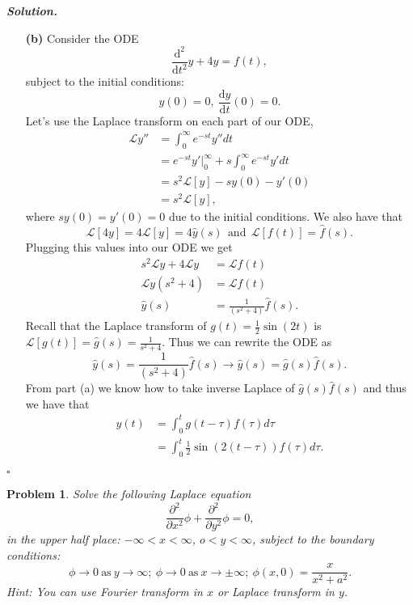 \documentclass[12pt]{report}
\newtheorem{problem}{Problem}
\newenvironment{solution}[1][\it{Solution}]{\textbf{#1. } }{$\square$}
\def\L{{\mathcal{L}}}
\newcommand{\ppn}[3]{\frac{\partial^{#1} #2}{\partial #3^{#1}}} %
\newcommand{\dd}[2]{\frac{\mathrm{d} #1}{\mathrm{d} #2}} %
\newcommand{\ddn}[3]{\frac{\mathrm{d}^{#1} #2}{\mathrm{d} #3^{#1}}} %
\begin{document}
\begin{solution}
\begin{enumerate}
        \item [{\bf (b)}]
        Consider the ODE
        \[ \ddn{2}{}{t}y + 4y = f(t),\]
        subject to the initial conditions:
        \[y(0) = 0, ~ \dd{y}{t}(0)=0. \]
        Let's use the Laplace transform on each part of our ODE,
        \begin{align*}
            \L{y''} &= \int_0^\infty e^{-st}y'' dt\\
            &= e^{-st}y' \bigg|_0^\infty + s \int_0^\infty e^{-st}y'dt\\
            &= s^2\L[y] - sy(0) - y'(0)\\
            &= s^2\L[y],
        \end{align*}
        where $sy(0) = y'(0) = 0$ due to the initial conditions. We also have that
        \[ \L[4y] = 4\L[y] = 4\hat{y}(s) ~~ \text{and} ~~ \L[f(t)] = \hat{f}(s).\]
        Plugging this values into our ODE we get
        \begin{align*}
            s^2\L{y} + 4\L{y} &= \L{f(t)}\\
            \L{y}(s^2 + 4) &= \L{f(t)}\\
            \hat{y}(s) &= \frac{1}{(s^2 + 4)}\hat{f}(s).
        \end{align*}
        Recall that the Laplace transform of $g(t) = \frac{1}{2} \sin(2t)$ is $\L[g(t)] = \hat{g}(s) = \frac{1}{s^2 + 4}$. Thus we can rewrite the ODE as
        \[ \hat{y}(s) = \frac{1}{(s^2 + 4)}\hat{f}(s) \rightarrow \hat{y}(s) = \hat{g}(s)\hat{f}(s).\] 
        From part (a) we know how to take inverse Laplace of $\hat{g}(s)\hat{f}(s)$ and thus we have that
        \begin{align*}
            y(t) &= \int_0^t g(t -\tau)f(\tau)d\tau\\
            &= \int_0^t \frac{1}{2}\sin(2(t - \tau))f(\tau)d\tau.
        \end{align*}

    \end{enumerate}
\end{solution}

\vskip 20pt



\begin{problem}
    Solve the following Laplace equation
    \[ \ppn{2}{}{x} \phi + \ppn{2}{}{y}\phi = 0,\]
    in the upper half place: $-\infty < x < \infty$, $o < y < \infty$, subject to the boundary conditions:
    \[ \phi \to 0 ~\text{as}~ y\to \infty; ~ \phi \to 0 ~\text{as}~ x\to \pm \infty; ~\phi(x,0) = \frac{x}{x^2 + a^2}.\]
    Hint: You can use Fourier transform in $x$ or Laplace transform in $y$. 
\end{problem}
\end{document}
